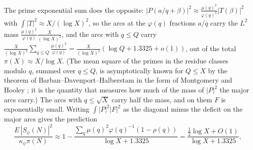 ﻿\documentclass[11pt]{amsart}
\theoremstyle{remark}
\begin{document}
The prime exponential sum does the opposite: $|P(a/q+\beta)|^2\approx\frac{\mu(q)^2}{\varphi(q)^2}|T(\beta)|^2$ with $\int|T|^2\approx X/(\log X)^2$, so the arcs at the $\varphi(q)$ fractions $a/q$ carry the $L^2$ mass $\frac{\mu(q)^2}{\varphi(q)}\frac X{(\log X)^2}$, and the arcs with $q\le Q$ carry $\frac{X}{(\log X)^2}\sum_{q\le Q}\frac{\mu(q)^2}{\varphi(q)}=\frac X{(\log X)^2}(\log Q+1.3325+o(1))$, out of the total $\pi(X)\approx X/\log X$. (The mean square of the primes in the residue classes modulo $q$, summed over $q\le Q$, is asymptotically known for $Q\le X$ by the theorem of Barban--Davenport--Halberstam in the form of Montgomery \cite{Montgomery} and Hooley \cite{Hooley}; it is the quantity that measures how much of the mass of $|P|^2$ the major arcs carry.) The arcs with $q\le\sqrt X$ carry half the mass, and on them $F$ is exponentially small. Writing $\int|P|^2|F|^2$ as the diagonal minus the deficit on the major arcs gives the prediction
\[
\frac{E\,|S_\psi(N)|^2}{\kappa_\psi\pi(N)}\approx1-\frac{\sum_q\mu(q)^2\varphi(q)^{-1}(1-\rho(q))}{\log X+1.3325}=\frac{\frac12\log X+O(1)}{\log X+1.3325},
\]
\end{document}
